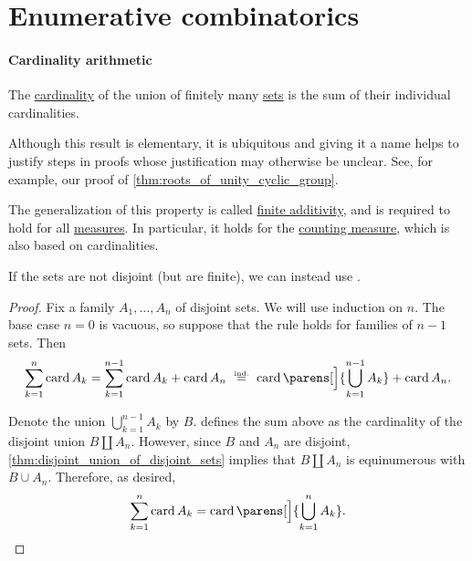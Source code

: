\section{Enumerative combinatorics}\label{sec:enumerative_combinatorics}

\paragraph{Cardinality arithmetic}

\begin{theorem}\label{thm:cardinality_sum_rule}
  The \hyperref[thm:cardinality_existence]{cardinality} of the union of finitely many  \hyperref[def:set]{sets} is the sum of their individual cardinalities.
\end{theorem}
\begin{comments}
  \item Although this result is elementary, it is ubiquitous and giving it a name helps to justify steps in proofs whose justification may otherwise be unclear. See, for example, our proof of \cref{thm:roots_of_unity_cyclic_group}.

  \item The generalization of this property is called \hyperref[def:boolean_algebra_additive_function/finite]{finite additivity}, and is required to hold for all \hyperref[def:measure]{measures}. In particular, it holds for the \hyperref[def:counting_measure]{counting measure}, which is also based on cardinalities.

  \item If the sets are not disjoint (but are finite), we can instead use .
\end{comments}
\begin{proof}
  Fix a family \( A_1, \ldots, A_n \) of disjoint sets. We will use induction on \( n \). The base case \( n = 0 \) is vacuous, so suppose that the rule holds for families of \( n - 1 \) sets. Then
  \begin{equation*}
    \sum_{k=1}^n \card A_k
    =
    \sum_{k=1}^{n-1} \card A_k + \card A_n
    \reloset {\T{ind.}} =
    \card\parens[\Big]{ \bigcup_{k=1}^{n-1} A_k } + \card A_n.
  \end{equation*}

  Denote the union \( \bigcup_{k=1}^{n-1} A_k \) by \( B \).  defines the sum above as the cardinality of the disjoint union \( B \amalg A_n \). However, since \( B \) and \( A_n \) are disjoint, \cref{thm:disjoint_union_of_disjoint_sets} implies that \( B \amalg A_n \) is equinumerous with \( B \cup A_n \). Therefore, as desired,
  \begin{equation*}
    \sum_{k=1}^n \card A_k = \card\parens[\Big]{ \bigcup_{k=1}^n A_k }.
  \end{equation*}
\end{proof}

